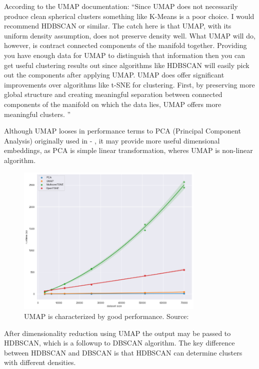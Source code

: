 According to the UMAP documentation: ``Since UMAP does not necessarily produce clean spherical clusters something like K-Means is a poor choice. I would recommend HDBSCAN or similar. 
The catch here is that UMAP, with its uniform density assumption, does not preserve density well. 
What UMAP will do, however, is contract connected components of the manifold together. 
Providing you have enough data for UMAP to distinguish that information then you can get useful clustering results out since algorithms like HDBSCAN will easily pick out the components after applying UMAP.
UMAP does offer significant improvements over algorithms like t-SNE for clustering. 
First, by preserving more global structure and creating meaningful separation between connected components of the manifold on which the data lies, UMAP offers more meaningful clusters. \cite{umapFaq}''

Although UMAP looses in performance terms to PCA (Principal Component Analysis) originally used in \cite{Lach2022} - , it may provide more useful dimensional embeddings, as PCA is simple linear transformation, wheres UMAP is non-linear algorithm. 
\begin{figure}[H] 
  \centering     
  \includegraphics[width=0.8\textwidth]{img/performance_umap.png} 
  \caption{UMAP is characterized by good performance. Source: \cite{umapPerformance}}
  \label{fig:umap_performance}
\end{figure}

After dimensionality reduction using UMAP the output may be passed to HDBSCAN, which is a followup to DBSCAN algorithm.
The key difference between HDBSCAN and DBSCAN is that HDBSCAN can determine clusters with different densities.